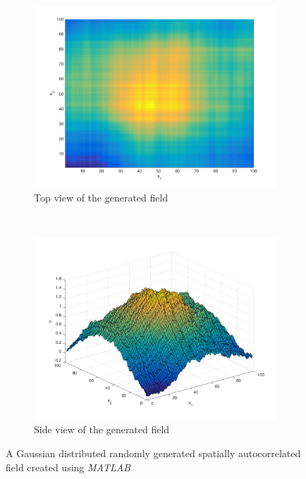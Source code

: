 \documentclass[11pt]{ucthesis}
\begin{document}
\begin{figure}[ht!]
    \centering
    \begin{subfigure}[t]{0.5\textwidth}
        \centering
        \includegraphics[width=\linewidth]{figures/generated_field_top_view.png}
        \captionsetup{skip=0.5\baselineskip,size=footnotesize}
        \caption{Top view of the generated field}
		\label{fig:top_view_field}
    \end{subfigure}%
    ~ 
    \begin{subfigure}[t]{0.5\textwidth}
        \centering
        \includegraphics[width=\linewidth]{figures/generated_field_side_view.png}
		\captionsetup{skip=0.5\baselineskip,size=footnotesize}
		\caption{Side view of the generated field}
		\label{fig:side_view_field}
    \end{subfigure}

    \captionsetup{skip=0.5\baselineskip,size=footnotesize}
    \caption{A Gaussian distributed randomly generated spatially autocorrelated field created using \textit{MATLAB}}
    \label{fig:gen_field}
\end{figure}
\end{document}
